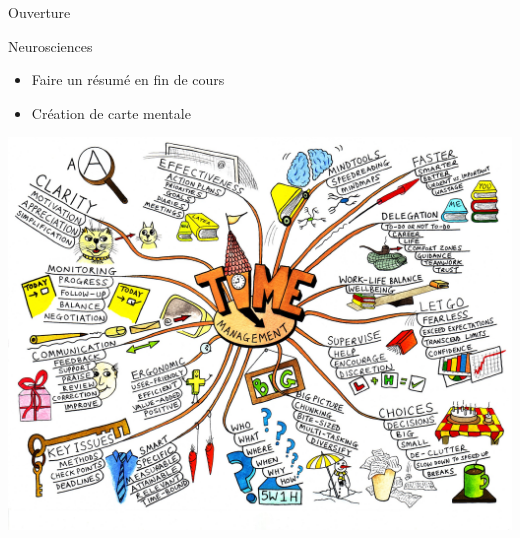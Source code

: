 \begin{frame}{Ouverture}
  \vfill
    \begin{block}{Neurosciences}
    \begin{itemize}
    \item Faire un résumé en fin de cours
    \item Création de carte mentale
    \end{itemize}
  \end{block}
  \vfill
  \begin{center}
    \includegraphics[width=.6\textwidth]{../resources/illustrations/mindmap.jpg}
  \end{center}
    \vfill
\end{frame}

